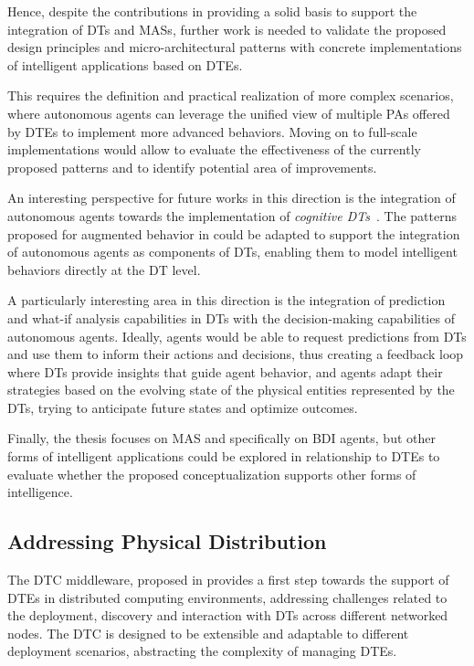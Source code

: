 Hence, despite the contributions in  providing a solid basis to support the integration of \acp{DT} and \acp{MAS}, further work is needed to validate the proposed design principles and micro-architectural patterns with concrete implementations of intelligent applications based on \acp{DTE}. 

This requires the definition and practical realization of more complex scenarios, where autonomous agents can leverage the unified view of multiple \acp{PA} offered by \acp{DTE} to implement more advanced behaviors. 
%
Moving on to full-scale implementations would allow to evaluate the effectiveness of the currently proposed patterns and to identify potential area of improvements.

An interesting perspective for future works in this direction is the integration of autonomous agents towards the implementation of \emph{cognitive \acp{DT}}~\cite{Minerva_Crespi_Farahbakhsh_Awan_2023}.
%
The patterns proposed for augmented behavior in  could be adapted to support the integration of autonomous agents as components of \acp{DT}, enabling them to model intelligent behaviors directly at the \ac{DT} level.

A particularly interesting area in this direction is the integration of prediction and what-if analysis capabilities in \acp{DT} with the decision-making capabilities of autonomous agents.
%
Ideally, agents would be able to request predictions from \acp{DT} and use them to inform their actions and decisions, thus creating a feedback loop where \acp{DT} provide insights that guide agent behavior, and agents adapt their strategies based on the evolving state of the physical entities represented by the \acp{DT}, trying to anticipate future states and optimize outcomes.

Finally, the thesis focuses on \ac{MAS} and specifically on \ac{BDI} agents, but other forms of intelligent applications could be explored in relationship to \acp{DTE} to evaluate whether the proposed conceptualization supports other forms of intelligence. 

\subsection*{Addressing Physical Distribution}

The \ac{DTC} middleware, proposed in  provides a first step towards the support of \acp{DTE} in distributed computing environments, addressing challenges related to the deployment, discovery and interaction with \acp{DT} across different networked nodes.
%
The \ac{DTC} is designed to be extensible and adaptable to different deployment scenarios, abstracting the complexity of managing \acp{DTE}. 

